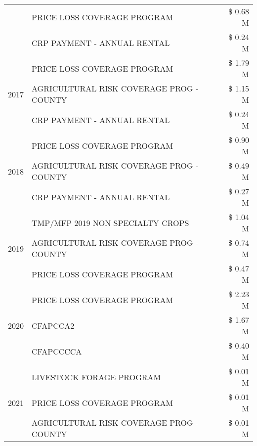 \begin{tabular}{llr}
 & PRICE LOSS COVERAGE PROGRAM & \$ 0.68 M \\
 & CRP PAYMENT - ANNUAL RENTAL & \$ 0.24 M \\
\cline{1-3}
\multirow[t]{3}{*}{2017} & PRICE LOSS COVERAGE PROGRAM & \$ 1.79 M \\
 & AGRICULTURAL RISK COVERAGE PROG - COUNTY & \$ 1.15 M \\
 & CRP PAYMENT - ANNUAL RENTAL & \$ 0.24 M \\
\cline{1-3}
\multirow[t]{3}{*}{2018} & PRICE LOSS COVERAGE PROGRAM & \$ 0.90 M \\
 & AGRICULTURAL RISK COVERAGE PROG - COUNTY & \$ 0.49 M \\
 & CRP PAYMENT - ANNUAL RENTAL & \$ 0.27 M \\
\cline{1-3}
\multirow[t]{3}{*}{2019} & TMP/MFP 2019 NON SPECIALTY CROPS & \$ 1.04 M \\
 & AGRICULTURAL RISK COVERAGE PROG - COUNTY & \$ 0.74 M \\
 & PRICE LOSS COVERAGE PROGRAM & \$ 0.47 M \\
\cline{1-3}
\multirow[t]{3}{*}{2020} & PRICE LOSS COVERAGE PROGRAM & \$ 2.23 M \\
 & CFAPCCA2 & \$ 1.67 M \\
 & CFAPCCCCA & \$ 0.40 M \\
\cline{1-3}
\multirow[t]{3}{*}{2021} & LIVESTOCK FORAGE PROGRAM & \$ 0.01 M \\
 & PRICE LOSS COVERAGE PROGRAM & \$ 0.01 M \\
 & AGRICULTURAL RISK COVERAGE PROG - COUNTY & \$ 0.01 M \\
\cline{1-3}
\bottomrule
\end{tabular}
